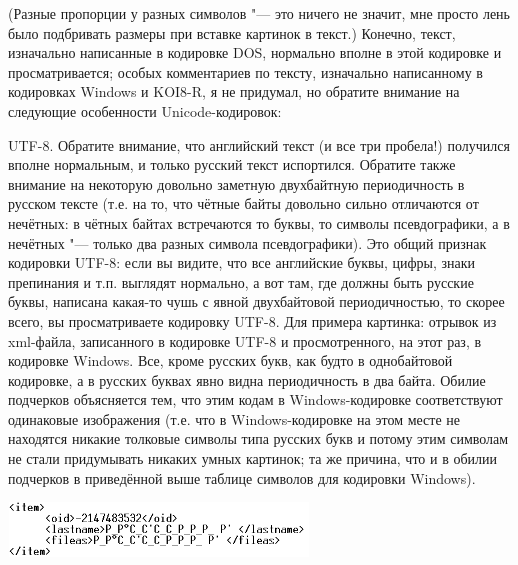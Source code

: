 (Разные пропорции у разных символов "--- это ничего не значит, мне просто лень было подбривать 
размеры при вставке картинок в текст.) Конечно, текст, изначально написанные в кодировке DOS, 
нормально вполне в этой кодировке и просматривается; особых комментариев по тексту, изначально 
написанному в кодировках Windows и KOI8-R, я не придумал, но обратите внимание на следующие 
особенности Unicode-кодировок:


\begin{ulist}
\item UTF-8.  Обратите внимание, что английский текст (и все три пробела!) получился вполне нормальным, и только русский 
текст испортился. Обратите также внимание на некоторую довольно заметную двухбайтную периодичность 
в русском тексте
(т.е. на то, что чётные байты довольно сильно отличаются от нечётных: в чётных байтах встречаются 
то буквы, то символы псевдографики, а в нечётных "--- только два разных символа псевдографики).
Это общий признак кодировки UTF-8: если вы видите, что все английские буквы, 
цифры, знаки препинания и т.п. выглядят нормально, а вот там, где должны быть русские буквы, 
написана какая-то чушь с явной двухбайтовой периодичностью, то скорее всего, вы просматриваете 
кодировку UTF-8. Для примера картинка: отрывок из xml-файла, записанного в кодировке UTF-8 и 
просмотренного, на этот раз, в кодировке Windows. Все, кроме русских букв, как будто в однобайтовой 
кодировке, а в русских буквах явно видна периодичность в два байта. Обилие подчерков объясняется 
тем, что этим кодам в Windows-кодировке соответствуют одинаковые изображения (т.е. что в 
Windows-кодировке на этом месте не находятся никакие толковые символы типа русских букв и потому
этим символам не стали придумывать никаких умных картинок; та же причина, что и в обилии подчерков в
приведённой выше таблице символов для кодировки Windows).
\begin{center}
\includegraphics[width=8cm,height=1.44cm]{ideas/03_1_encodings/utf8_contact.bmp}
\end{center}


\end{ulist}
